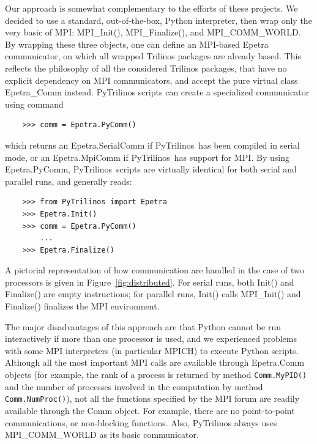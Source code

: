 \documentclass[acmtocl]{acmtrans2m}
\newcommand{\PyTrilinos}{{PyTrilinos}}
\begin{document}
Our approach is somewhat complementary to the efforts of these
projects.  We decided to use a standard, out-of-the-box, Python
interpreter, then wrap only the very basic of MPI: MPI\_Init(),
MPI\_Finalize(), and MPI\_COMM\_WORLD. By wrapping these three
objects, one can define an MPI-based Epetra communicator, on which all
wrapped Trilinos packages are already based. This reflects the
philosophy of all the considered Trilinos packages, that have no
explicit dependency on MPI communicators, and accept the pure virtual
class Epetra\_Comm instead. PyTrilinos scripts can create a
specialized communicator using command
\begin{verbatim}
    >>> comm = Epetra.PyComm()
\end{verbatim}
which returns an Epetra.SerialComm if \PyTrilinos\ has been compiled
in serial mode, or an Epetra.MpiComm if \PyTrilinos\ has support for
MPI. By using Epetra.PyComm, \PyTrilinos\ scripts are virtually
identical for both serial and parallel runs, and generally reads:
\begin{verbatim}
    >>> from PyTrilinos import Epetra
    >>> Epetra.Init()
    >>> comm = Epetra.PyComm()
        ...
    >>> Epetra.Finalize()
\end{verbatim}
A pictorial representation of how communication are handled in the
case of two processors is given in Figure~\ref{fig:distributed}. For
serial runs, both Init() and Finalize() are empty instructions; for
parallel runs, Init() calls MPI\_Init() and Finalize() finalizes the
MPI environment.

\smallskip

The major disadvantages of this approach are that Python cannot be run
interactively if more than one processor is used, and we experienced
problems with some MPI interpreters (in particular MPICH) to execute
Python scripts.  Although all the most important MPI calls are
available through Epetra.Comm objects (for example, the rank of a
process is returned by method {\tt Comm.MyPID()} and the number of
processes involved in the computation by method {\tt Comm.NumProc()}),
not all the functions specified by the MPI forum are readily available
through the Comm object.  For example, there are no point-to-point
communications, or non-blocking functions. Also, PyTrilinos always
uses MPI\_COMM\_WORLD as its basic communicator.
\end{document}
